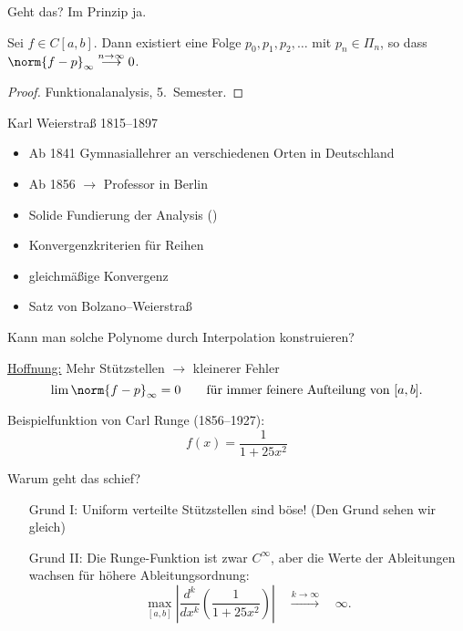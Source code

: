 \medskip

Geht das? Im Prinzip ja.

\begin{satz}[Weierstraß]
 Sei $f\in C[a,b]$. Dann existiert eine Folge $p_0,p_1,p_2,\hdots$ mit $p_n\in\Pi_n$, so dass $\norm{f-p}_\infty \stackrel{n\to\infty}{\longrightarrow} 0$.
\end{satz}

\begin{proof}
Funktionalanalysis, 5.~Semester.
\end{proof}

Karl Weierstraß 1815--1897
\begin{itemize}
 \item Ab 1841 Gymnasiallehrer an verschiedenen Orten in Deutschland
 \item Ab 1856 $\rightarrow$ Professor in Berlin
 \item Solide Fundierung der Analysis ()
 \item Konvergenzkriterien für Reihen
 \item gleichmäßige Konvergenz
 \item Satz von Bolzano--Weierstraß
\end{itemize}


Kann man solche Polynome durch Interpolation konstruieren?

\bigskip

\underline{Hoffnung:} Mehr Stützstellen $\rightarrow$ kleinerer Fehler
\begin{equation*}
 \lim \norm{ f-p }_\infty = 0 \qquad \text{für immer feinere Aufteilung von $[a,b]$}.
\end{equation*}


\bigskip

Beispielfunktion von Carl Runge (1856--1927):
\begin{equation*}
       f(x) = \frac{1}{1+25x^2}
\end{equation*}


Warum geht das schief?

\bigskip

\begin{itemize}
 \item [Grund I:] Uniform verteilte Stützstellen sind böse! (Den Grund sehen wir gleich)

 \item [Grund II:] Die Runge-Funktion ist zwar $C^\infty$, aber die Werte der Ableitungen wachsen für höhere Ableitungsordnung:
\begin{equation*}
    \max_{[a,b]} \left\vert \frac{d^k}{dx^k} \left(\frac{1}{1+25x^2} \right) \right\vert
    \quad  \stackrel{k\to\infty}{\longrightarrow} \quad
    \infty.
\end{equation*}
\end{itemize}


